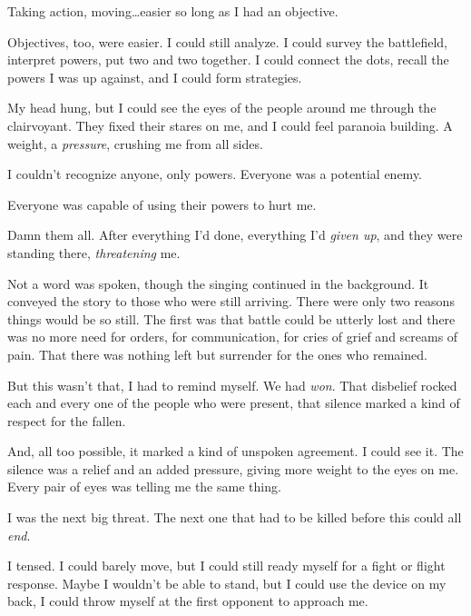 Taking action, moving\ldots easier so long as I had an objective.



Objectives, too, were easier.  I could still analyze.  I could survey the battlefield, interpret powers, put two and two together.  I could connect the dots, recall the powers I was up against, and I could form strategies.



My head hung, but I could see the eyes of the people around me through the clairvoyant.  They fixed their stares on me, and I could feel paranoia building.  A weight, a \emph{pressure}, crushing me from all sides.



I couldn't recognize anyone, only powers.  Everyone was a potential enemy.



Everyone was capable of using their powers to hurt me.



Damn them all.  After everything I'd done, everything I'd \emph{given up}, and they were standing there, \emph{threatening} me.



Not a word was spoken, though the singing continued in the background.  It conveyed the story to those who were still arriving.  There were only two reasons things would be so still.  The first was that battle could be utterly lost and there was no more need for orders, for communication, for cries of grief and screams of pain.  That there was nothing left but surrender for the ones who remained.



But this wasn't that, I had to remind myself.  We had \emph{won}.  That disbelief rocked each and every one of the people who were present, that silence marked a kind of respect for the fallen.



And, all too possible, it marked a kind of unspoken agreement.  I could see it.  The silence was a relief and an added pressure, giving more weight to the eyes on me.  Every pair of eyes was telling me the same thing.



I was the next big threat.  The next one that had to be killed before this could all \emph{end}.



I tensed.  I could barely move, but I could still ready myself for a fight or flight response.  Maybe I wouldn't be able to stand, but I could use the device on my back, I could throw myself at the first opponent to approach me.



